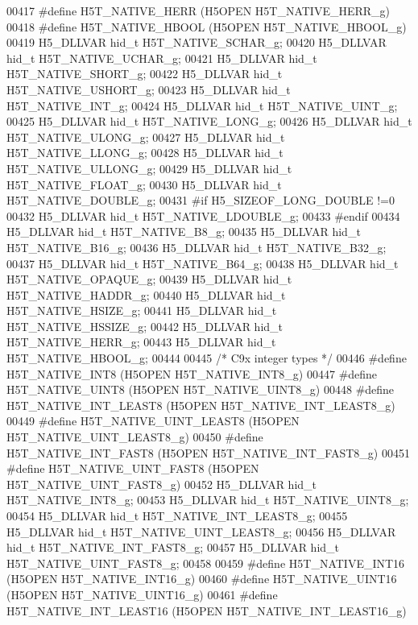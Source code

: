 \begin{DoxyCode}
00417 \textcolor{preprocessor}{#define H5T\_NATIVE\_HERR     (H5OPEN H5T\_NATIVE\_HERR\_g)}
00418 \textcolor{preprocessor}{#define H5T\_NATIVE\_HBOOL    (H5OPEN H5T\_NATIVE\_HBOOL\_g)}
00419 H5\_DLLVAR hid\_t H5T\_NATIVE\_SCHAR\_g;
00420 H5\_DLLVAR hid\_t H5T\_NATIVE\_UCHAR\_g;
00421 H5\_DLLVAR hid\_t H5T\_NATIVE\_SHORT\_g;
00422 H5\_DLLVAR hid\_t H5T\_NATIVE\_USHORT\_g;
00423 H5\_DLLVAR hid\_t H5T\_NATIVE\_INT\_g;
00424 H5\_DLLVAR hid\_t H5T\_NATIVE\_UINT\_g;
00425 H5\_DLLVAR hid\_t H5T\_NATIVE\_LONG\_g;
00426 H5\_DLLVAR hid\_t H5T\_NATIVE\_ULONG\_g;
00427 H5\_DLLVAR hid\_t H5T\_NATIVE\_LLONG\_g;
00428 H5\_DLLVAR hid\_t H5T\_NATIVE\_ULLONG\_g;
00429 H5\_DLLVAR hid\_t H5T\_NATIVE\_FLOAT\_g;
00430 H5\_DLLVAR hid\_t H5T\_NATIVE\_DOUBLE\_g;
00431 \textcolor{preprocessor}{#if H5\_SIZEOF\_LONG\_DOUBLE !=0}
00432 H5\_DLLVAR hid\_t H5T\_NATIVE\_LDOUBLE\_g;
00433 \textcolor{preprocessor}{#endif}
00434 H5\_DLLVAR hid\_t H5T\_NATIVE\_B8\_g;
00435 H5\_DLLVAR hid\_t H5T\_NATIVE\_B16\_g;
00436 H5\_DLLVAR hid\_t H5T\_NATIVE\_B32\_g;
00437 H5\_DLLVAR hid\_t H5T\_NATIVE\_B64\_g;
00438 H5\_DLLVAR hid\_t H5T\_NATIVE\_OPAQUE\_g;
00439 H5\_DLLVAR hid\_t H5T\_NATIVE\_HADDR\_g;
00440 H5\_DLLVAR hid\_t H5T\_NATIVE\_HSIZE\_g;
00441 H5\_DLLVAR hid\_t H5T\_NATIVE\_HSSIZE\_g;
00442 H5\_DLLVAR hid\_t H5T\_NATIVE\_HERR\_g;
00443 H5\_DLLVAR hid\_t H5T\_NATIVE\_HBOOL\_g;
00444 
00445 \textcolor{comment}{/* C9x integer types */}
00446 \textcolor{preprocessor}{#define H5T\_NATIVE\_INT8         (H5OPEN H5T\_NATIVE\_INT8\_g)}
00447 \textcolor{preprocessor}{#define H5T\_NATIVE\_UINT8        (H5OPEN H5T\_NATIVE\_UINT8\_g)}
00448 \textcolor{preprocessor}{#define H5T\_NATIVE\_INT\_LEAST8       (H5OPEN H5T\_NATIVE\_INT\_LEAST8\_g)}
00449 \textcolor{preprocessor}{#define H5T\_NATIVE\_UINT\_LEAST8      (H5OPEN H5T\_NATIVE\_UINT\_LEAST8\_g)}
00450 \textcolor{preprocessor}{#define H5T\_NATIVE\_INT\_FAST8        (H5OPEN H5T\_NATIVE\_INT\_FAST8\_g)}
00451 \textcolor{preprocessor}{#define H5T\_NATIVE\_UINT\_FAST8       (H5OPEN H5T\_NATIVE\_UINT\_FAST8\_g)}
00452 H5\_DLLVAR hid\_t H5T\_NATIVE\_INT8\_g;
00453 H5\_DLLVAR hid\_t H5T\_NATIVE\_UINT8\_g;
00454 H5\_DLLVAR hid\_t H5T\_NATIVE\_INT\_LEAST8\_g;
00455 H5\_DLLVAR hid\_t H5T\_NATIVE\_UINT\_LEAST8\_g;
00456 H5\_DLLVAR hid\_t H5T\_NATIVE\_INT\_FAST8\_g;
00457 H5\_DLLVAR hid\_t H5T\_NATIVE\_UINT\_FAST8\_g;
00458 
00459 \textcolor{preprocessor}{#define H5T\_NATIVE\_INT16        (H5OPEN H5T\_NATIVE\_INT16\_g)}
00460 \textcolor{preprocessor}{#define H5T\_NATIVE\_UINT16       (H5OPEN H5T\_NATIVE\_UINT16\_g)}
00461 \textcolor{preprocessor}{#define H5T\_NATIVE\_INT\_LEAST16      (H5OPEN H5T\_NATIVE\_INT\_LEAST16\_g)}

\end{DoxyCode}
